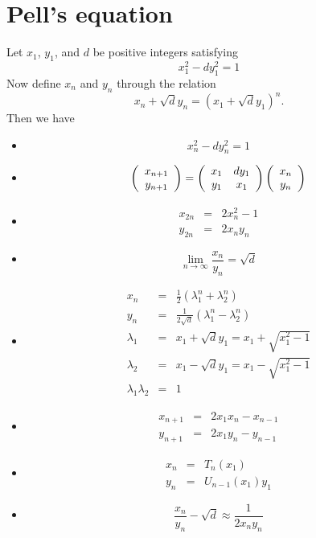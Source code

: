 \documentclass[12pt,oneside,a4paper]{article}
\begin{document}
\section{Pell's equation}
Let $x_1$, $y_1$, and $d$ be positive integers satisfying
\begin{equation*}
    x_1^2 - d y_1^2 = 1
\end{equation*}
Now define $x_n$ and $y_n$ through the relation
\begin{equation*}
    x_n + \sqrt{d} y_n = \left(x_1 + \sqrt{d} y_1\right)^n.
\end{equation*}
Then we have
\begin{itemize}
    \item $$ x_n^2 - d y_n^2 = 1 $$
    \item $$ 
        \left( \begin{array}{c}
            x_{n+1} \\
            y_{n+1}
        \end{array} \right)
        = \left( \begin{array}{c c}
            x_1 & d y_1 \\
            y_1 & x_1
        \end{array} \right)
        \left( \begin{array}{c}
            x_{n} \\
            y_{n}
        \end{array} \right) $$
    \item 
        \begin{eqnarray*}
            x_{2n} &=& 2x_n^2 - 1 \\
            y_{2n} &=& 2x_ny_n
        \end{eqnarray*}
    \item $$ \lim_{n\rightarrow\infty} \frac{x_n}{y_n} = \sqrt{d} $$
    \item 
        \begin{eqnarray*}
            x_n &=& \frac12 \left(\lambda_1^n + \lambda_2^n\right) \\
            y_n &=& \frac1{2\sqrt{d}} \left(\lambda_1^n - \lambda_2^n\right) \\
            \lambda_1 &=& x_1 + \sqrt{d} y_1 = x_1 + \sqrt{x_1^2-1} \\
            \lambda_2 &=& x_1 - \sqrt{d} y_1 = x_1 - \sqrt{x_1^2-1} \\
            \lambda_1 \lambda_2 &=& 1
        \end{eqnarray*}
    \item
        \begin{eqnarray*}
            x_{n+1} &=& 2x_1x_n - x_{n-1} \\
            y_{n+1} &=& 2x_1y_n - y_{n-1}
        \end{eqnarray*}
    \item
        \begin{eqnarray*}
            x_n &=& T_n(x_1) \\
            y_n &=& U_{n-1}(x_1) y_1
        \end{eqnarray*}
    \item $$ \frac{x_n}{y_n} - \sqrt{d} \approx \frac{1}{2x_ny_n} $$

\end{itemize}
\end{document}
